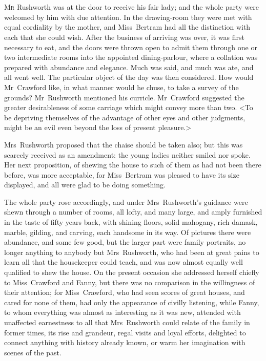 \chapter[Chapter \thechapter]{} 

 \lettrine[lraise=0.3]{M}{r} Rushworth was at the door to receive his fair lady; and the whole party were welcomed by him with due attention. In the drawing-room they were met with equal cordiality by the mother, and Miss~Bertram had all the distinction with each that she could wish. After the business of arriving was over, it was first necessary to eat, and the doors were thrown open to admit them through one or two intermediate rooms into the appointed dining-parlour, where a collation was prepared with abundance and elegance. Much was said, and much was ate, and all went well. The particular object of the day was then considered. How would Mr~Crawford like, in what manner would he chuse, to take a survey of the grounds? Mr~Rushworth mentioned his curricle. Mr~Crawford suggested the greater desirableness of some carriage which might convey more than two. <To be depriving themselves of the advantage of other eyes and other judgments, might be an evil even beyond the loss of present pleasure.>

Mrs~Rushworth proposed that the chaise should be taken also; but this was scarcely received as an amendment: the young ladies neither smiled nor spoke. Her next proposition, of shewing the house to such of them as had not been there before, was more acceptable, for Miss~Bertram was pleased to have its size displayed, and all were glad to be doing something.

The whole party rose accordingly, and under Mrs~Rushworth's guidance were shewn through a number of rooms, all lofty, and many large, and amply furnished in the taste of fifty years back, with shining floors, solid mahogany, rich damask, marble, gilding, and carving, each handsome in its way. Of pictures there were abundance, and some few good, but the larger part were family portraits, no longer anything to anybody but Mrs~Rushworth, who had been at great pains to learn all that the housekeeper could teach, and was now almost equally well qualified to shew the house. On the present occasion she addressed herself chiefly to Miss~Crawford and Fanny, but there was no comparison in the willingness of their attention; for Miss~Crawford, who had seen scores of great houses, and cared for none of them, had only the appearance of civilly listening, while Fanny, to whom everything was almost as interesting as it was new, attended with unaffected earnestness to all that Mrs~Rushworth could relate of the family in former times, its rise and grandeur, regal visits and loyal efforts, delighted to connect anything with history already known, or warm her imagination with scenes of the past.

